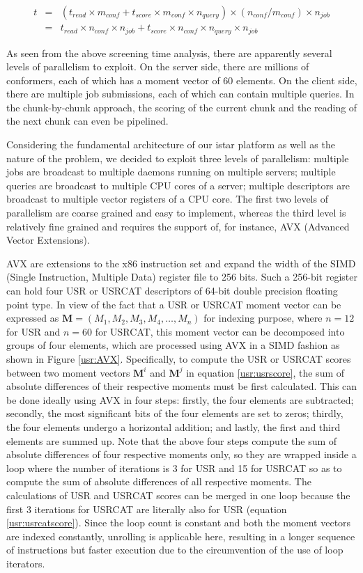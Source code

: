 \begin{eqnarray}
t&=&(t_{read}\times m_{conf}+t_{score}\times m_{conf}\times n_{query})\times(n_{conf}/m_{conf})\times n_{job}\nonumber\\
 &=&t_{read}\times n_{conf}\times n_{job}+t_{score}\times n_{conf}\times n_{query}\times n_{job}
\label{usr:time1}
\end{eqnarray}

As seen from the above screening time analysis, there are apparently several levels of parallelism to exploit. On the server side, there are millions of conformers, each of which has a moment vector of 60 elements. On the client side, there are multiple job submissions, each of which can contain multiple queries. In the chunk-by-chunk approach, the scoring of the current chunk and the reading of the next chunk can even be pipelined.

Considering the fundamental architecture of our istar platform \citep{1362} as well as the nature of the problem, we decided to exploit three levels of parallelism: multiple jobs are broadcast to multiple daemons running on multiple servers; multiple queries are broadcast to multiple CPU cores of a server; multiple descriptors are broadcast to multiple vector registers of a CPU core. The first two levels of parallelism are coarse grained and easy to implement, whereas the third level is relatively fine grained and requires the support of, for instance, AVX (Advanced Vector Extensions).

AVX are extensions to the x86 instruction set and expand the width of the SIMD (Single Instruction, Multiple Data) register file to 256 bits. Such a 256-bit register can hold four USR or USRCAT descriptors of 64-bit double precision floating point type. In view of the fact that a USR or USRCAT moment vector can be expressed as $\mathbf M=(M_1, M_2, M_3, M_4, \ldots, M_n)$ for indexing purpose, where $n=12$ for USR and $n=60$ for USRCAT, this moment vector can be decomposed into groups of four elements, which are processed using AVX in a SIMD fashion as shown in Figure \ref{usr:AVX}. Specifically, to compute the USR or USRCAT scores between two moment vectors $\mathbf M^i$ and $\mathbf M^j$ in equation \eqref{usr:usrscore}, the sum of absolute differences of their respective moments must be first calculated. This can be done ideally using AVX in four steps: firstly, the four elements are subtracted; secondly, the most significant bits of the four elements are set to zeros; thirdly, the four elements undergo a horizontal addition; and lastly, the first and third elements are summed up. Note that the above four steps compute the sum of absolute differences of four respective moments only, so they are wrapped inside a loop where the number of iterations is 3 for USR and 15 for USRCAT so as to compute the sum of absolute differences of all respective moments. The calculations of USR and USRCAT scores can be merged in one loop because the first 3 iterations for USRCAT are literally also for USR (equation \eqref{usr:usrcatscore}). Since the loop count is constant and both the moment vectors are indexed constantly, unrolling is applicable here, resulting in a longer sequence of instructions but faster execution due to the circumvention of the use of loop iterators.


